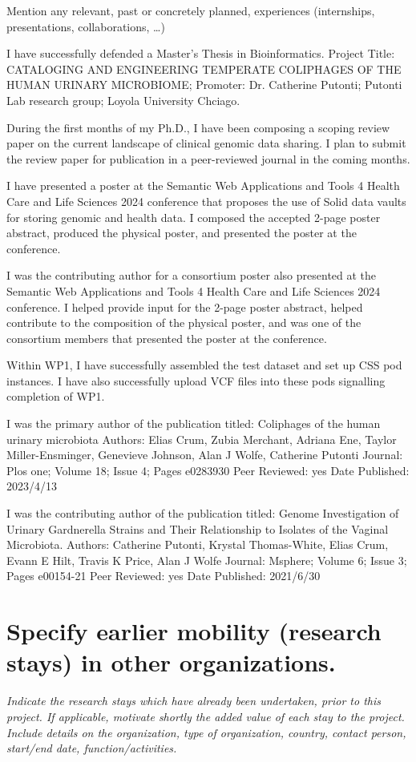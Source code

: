 {{Mention any relevant, past or concretely planned, experiences (internships, presentations, collaborations, …)
}

I have successfully defended a Master's Thesis in Bioinformatics. Project Title: CATALOGING AND ENGINEERING TEMPERATE COLIPHAGES OF THE HUMAN
URINARY MICROBIOME; Promoter: Dr. Catherine Putonti; Putonti Lab research group; Loyola University Chciago. 


During the first months of my Ph.D., I have been composing a scoping review paper on the current landscape of clinical genomic data sharing.
I plan to submit the review paper for publication in a peer-reviewed journal in the coming months.

I have presented a poster at the Semantic Web Applications and Tools 4 Health Care and Life Sciences 2024 conference that proposes the use of Solid data vaults for storing genomic and health data.
I composed the accepted 2-page poster abstract, produced the physical poster, and presented the poster at the conference.

I was the contributing author for a consortium poster also presented at the Semantic Web Applications and Tools 4 Health Care and Life Sciences 2024 conference. I helped provide input for the 2-page poster abstract, helped contribute to the composition of the physical poster, and was one of the consortium members that presented the poster at the conference.

Within WP1, I have successfully assembled the test dataset and set up CSS pod instances.
I have also successfully upload VCF files into these pods signalling completion of WP1. 


I was the primary author of the publication titled: Coliphages of the human urinary microbiota
Authors: Elias Crum, Zubia Merchant, Adriana Ene, Taylor Miller-Ensminger, Genevieve Johnson, Alan J Wolfe, Catherine Putonti
Journal: Plos one; Volume 18; Issue 4; Pages e0283930
Peer Reviewed: yes
Date Published: 2023/4/13

I was the contributing author of the publication titled: Genome Investigation of Urinary Gardnerella Strains and Their Relationship to Isolates of the Vaginal Microbiota.
Authors: Catherine Putonti, Krystal Thomas-White, Elias Crum, Evann E Hilt, Travis K Price, Alan J Wolfe
Journal: Msphere; Volume 6; Issue 3; Pages e00154-21
Peer Reviewed: yes
Date Published: 2021/6/30


\section{Specify earlier mobility (research stays) in other organizations.}
\textit{
Indicate the research stays which have already been undertaken, prior to this project. 
If applicable, motivate shortly the added value of each stay to the project. 
Include details on the organization, type of organization, country, contact person, start/end date, function/activities.
}

}
